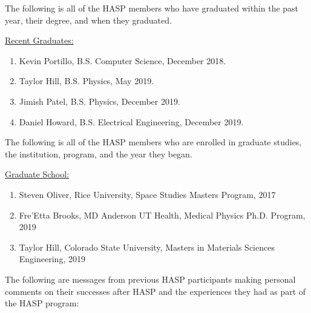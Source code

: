\begin{appendices}
  \vspace{0.5cm}
  
  \noindent The following is all of the HASP members who have graduated within the past year, their degree, and when they graduated.

  \vspace{0.25cm}
  \noindent\underline{Recent Graduates:}
  \begin{enumerate}[leftmargin=3\parindent]
  \item Kevin Portillo, B.S. Computer Science, December 2018.
  \item Taylor Hill, B.S. Physics, May 2019.
  \item Jimish Patel, B.S. Physics, December 2019.
  \item Daniel Howard, B.S. Electrical Engineering, December 2019.
  \end{enumerate}

  \vspace{0.5cm}
  
  \noindent The following is all of the HASP members who are enrolled in graduate studies, the institution, program, and the year they began.
  
  \vspace{0.25cm}
  \noindent\underline{Graduate School:}
  \begin{enumerate}[leftmargin=3\parindent]
  \item Steven Oliver, Rice University, Space Studies Masters Program, 2017
  \item Fre'Etta Brooks, MD Anderson UT Health, Medical Physics Ph.D. Program, 2019
  \item Taylor Hill, Colorado State University, Masters in Materials Sciences Engineering, 2019
  \end{enumerate}

  \noindent The following are messages from previous HASP participants making personal comments on their successes after HASP and the experiences they had as part of the HASP program:


\end{appendices}
